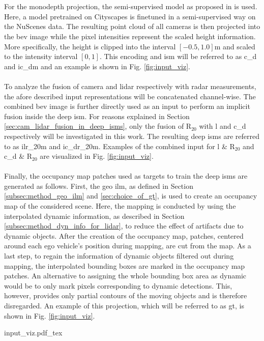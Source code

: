 \\\\
For the \gls{monodepth} projection, the semi-supervised model as proposed in \cite{guizilini2020robust} is used. Here, a model pretrained on Cityscapes is finetuned in a semi-supervised way on the NuScenes data. The resulting point cloud of all cameras is then projected into the \gls{bev} image while the pixel intensities represent the scaled height information. More specifically, the height is clipped into the interval $[-0.5,1.0]$m and scaled to the intensity interval $[0,1]$. This encoding and \gls{ism} will be referred to as \gls{c_d} and \gls{ic_dm} and an example is shown in Fig. \ref{fig:input_viz}.
\\\\
To analyze the fusion of camera and lidar respectively with radar measurements, the afore described input representations will be concatenated channel-wise. The combined \gls{bev} image is further directly used as an input to perform an implicit fusion inside the deep \gls{ism}. For reasons explained in Section \ref{sec:cam_lidar_fusion_in_deep_isms}, only the fusion of R$_{20}$ with \gls{l} and \gls{c_d} respectively will be investigated in this work. The resulting deep \gls{ism}s are referred to as \gls{ilr_20m} and \gls{ic_dr_20m}. Examples of the combined input for \gls{l} \& R$_{20}$ and \gls{c_d} \& R$_{20}$ are visualized in Fig. \ref{fig:input_viz}.
\\\\
Finally, the occupancy map patches used as targets to train the deep \gls{ism}s are generated as follows. First, the geo \gls{ilm}, as defined in Section \ref{subsec:method_geo_ilm} and \ref{sec:choice_of_gt}, is used to create an occupancy map of the considered scene. Here, the mapping is conducted by using the interpolated dynamic information, as described in Section \ref{subsec:method_dyn_info_for_lidar}, to reduce the effect of artifacts due to dynamic objects. After the creation of the occupancy map, patches, centered around each ego vehicle's position during mapping, are cut from the map. As a last step, to regain the information of dynamic objects filtered out during mapping, the interpolated bounding boxes are marked in the occupancy map patches. An alternative to assigning the whole bounding box area as dynamic would be to only mark pixels corresponding to dynamic detections. This, however, provides only partial contours of the moving objects and is therefore disregarded. An example of this projection, which will be referred to as \gls{gt}, is shown in Fig. \ref{fig:input_viz}.
\begin{center}
	{input_viz.pdf_tex}
\end{center}
%
